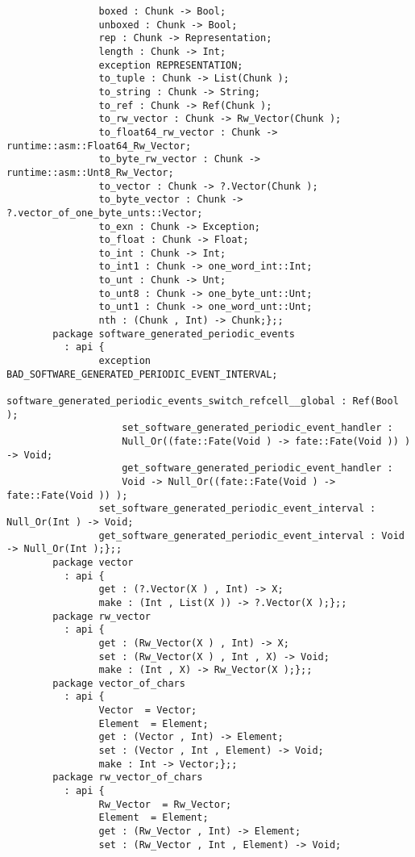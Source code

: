 \begin{verbatim}
                boxed : Chunk -> Bool;
                unboxed : Chunk -> Bool;
                rep : Chunk -> Representation;
                length : Chunk -> Int;
                exception REPRESENTATION;
                to_tuple : Chunk -> List(Chunk );
                to_string : Chunk -> String;
                to_ref : Chunk -> Ref(Chunk );
                to_rw_vector : Chunk -> Rw_Vector(Chunk );
                to_float64_rw_vector : Chunk -> runtime::asm::Float64_Rw_Vector;
                to_byte_rw_vector : Chunk -> runtime::asm::Unt8_Rw_Vector;
                to_vector : Chunk -> ?.Vector(Chunk );
                to_byte_vector : Chunk -> ?.vector_of_one_byte_unts::Vector;
                to_exn : Chunk -> Exception;
                to_float : Chunk -> Float;
                to_int : Chunk -> Int;
                to_int1 : Chunk -> one_word_int::Int;
                to_unt : Chunk -> Unt;
                to_unt8 : Chunk -> one_byte_unt::Unt;
                to_unt1 : Chunk -> one_word_unt::Unt;
                nth : (Chunk , Int) -> Chunk;};;
        package software_generated_periodic_events
          : api {
                exception BAD_SOFTWARE_GENERATED_PERIODIC_EVENT_INTERVAL;
                software_generated_periodic_events_switch_refcell__global : Ref(Bool );
                    set_software_generated_periodic_event_handler :
                    Null_Or((fate::Fate(Void ) -> fate::Fate(Void )) ) -> Void;
                    get_software_generated_periodic_event_handler :
                    Void -> Null_Or((fate::Fate(Void ) -> fate::Fate(Void )) );
                set_software_generated_periodic_event_interval : Null_Or(Int ) -> Void;
                get_software_generated_periodic_event_interval : Void -> Null_Or(Int );};;
        package vector
          : api {
                get : (?.Vector(X ) , Int) -> X;
                make : (Int , List(X )) -> ?.Vector(X );};;
        package rw_vector
          : api {
                get : (Rw_Vector(X ) , Int) -> X;
                set : (Rw_Vector(X ) , Int , X) -> Void;
                make : (Int , X) -> Rw_Vector(X );};;
        package vector_of_chars
          : api {
                Vector  = Vector;
                Element  = Element;
                get : (Vector , Int) -> Element;
                set : (Vector , Int , Element) -> Void;
                make : Int -> Vector;};;
        package rw_vector_of_chars
          : api {
                Rw_Vector  = Rw_Vector;
                Element  = Element;
                get : (Rw_Vector , Int) -> Element;
                set : (Rw_Vector , Int , Element) -> Void;

\end{verbatim}
